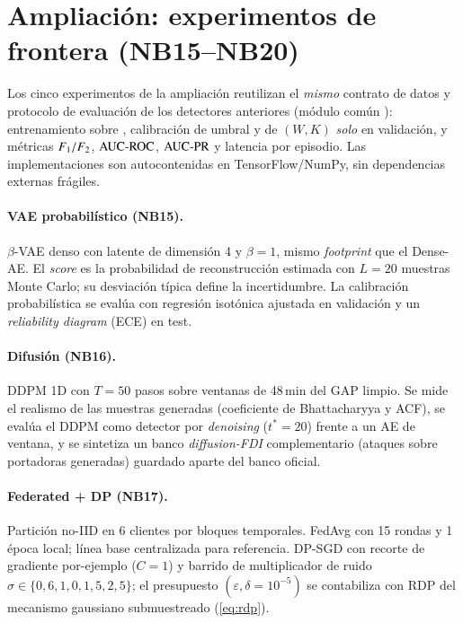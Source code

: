 \section{Ampliación: experimentos de frontera (NB15--NB20)}
\label{sec:diseno-ampliacion}

Los cinco experimentos de la ampliación reutilizan el \emph{mismo} contrato de datos y protocolo de evaluación de los detectores anteriores (módulo común ): entrenamiento sobre , calibración de umbral y de $(W,K)$ \emph{solo} en validación, y métricas $F_{1}/F_{2}$, $\text{AUC-ROC}$, $\text{AUC-PR}$ y latencia por episodio. Las implementaciones son autocontenidas en TensorFlow/NumPy, sin dependencias externas frágiles.

\paragraph{VAE probabilístico (NB15).} $\beta$-VAE denso con latente de dimensión 4 y $\beta=1$, mismo \emph{footprint} que el Dense-AE. El \textit{score} es la probabilidad de reconstrucción estimada con $L=20$ muestras Monte Carlo; su desviación típica define la incertidumbre. La calibración probabilística se evalúa con regresión isotónica ajustada en validación y un \emph{reliability diagram} (ECE) en test.

\paragraph{Difusión (NB16).} DDPM 1D con $T=50$ pasos sobre ventanas de 48\,min del GAP limpio. Se mide el realismo de las muestras generadas (coeficiente de Bhattacharyya y ACF), se evalúa el DDPM como detector por \emph{denoising} ($t^*=20$) frente a un AE de ventana, y se sintetiza un banco \emph{diffusion-FDI} complementario (ataques sobre portadoras generadas) guardado aparte del banco oficial.

\paragraph{Federated + DP (NB17).} Partición no-IID en 6 clientes por bloques temporales. FedAvg con 15 rondas y 1 época local; línea base centralizada para referencia. DP-SGD con recorte de gradiente por-ejemplo ($C=1$) y barrido de multiplicador de ruido $\sigma\in\{0{,}6,1{,}0,1{,}5,2{,}5\}$; el presupuesto $(\varepsilon,\delta{=}10^{-5})$ se contabiliza con RDP del mecanismo gaussiano submuestreado (\cref{eq:rdp}).

